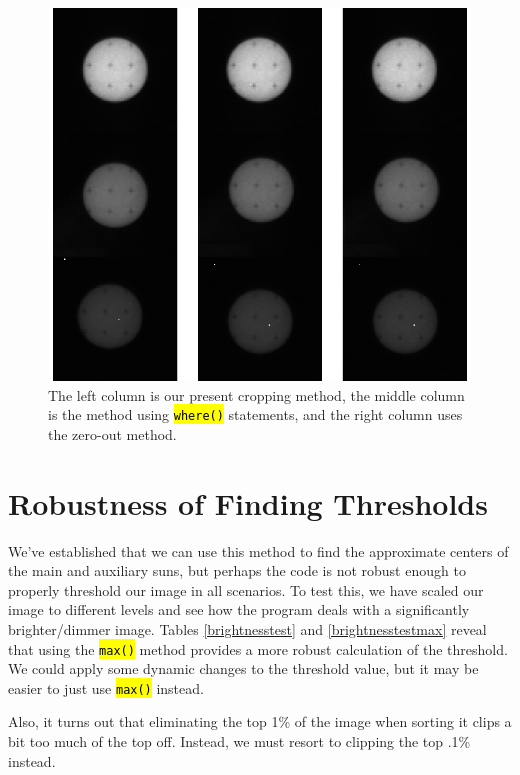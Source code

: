 \documentclass[10pt]{scrartcl}
\begin{document}
\begin{figure}[!ht]
    \centering
    \includegraphics[width=.9\textwidth]{../plots_tables_images/betterenough.eps}
    \caption{The left column is our present cropping method, the middle column is the method using \hl{\texttt{where()}} statements, and the right column uses the zero-out method.}
    \label{betterenough}
\end{figure}


\section{Robustness of Finding Thresholds} %
\label{sec:robustness_of_finding_thresholds}

We've established that we can use this method to find the approximate centers of the main and auxiliary suns, but perhaps the code is not robust enough to properly threshold our image in all scenarios. To test this, we have scaled our image to different levels and see how the program deals with a significantly brighter/dimmer image. Tables \ref{brightnesstest} and \ref{brightnesstestmax} reveal that using the \hl{\texttt{max()}} method provides a more robust calculation of the threshold. We could apply some dynamic changes to the threshold value, but it may be easier to just use \hl{\texttt{max()}} instead.

Also, it turns out that eliminating the top 1\% of the image when sorting it clips a bit too much of the top off. Instead, we must resort to clipping the top .1\% instead. \\
\end{document}
